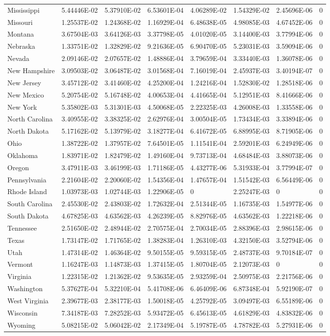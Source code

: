 \begin{longtable}[c]{p{0.75in}p{0.75in}p{0.75in}p{0.75in}p{0.75in}p{0.75in}p{0.75in}p{0.75in}}
Mississippi & 5.44446E-02 & 5.37910E-02 & 6.53601E-04 & 4.06289E-02 & 1.54329E-02 & 2.45696E-06 & 0 \tabularnewline
Missouri & 1.25537E-02 & 1.24368E-02 & 1.16929E-04 & 6.48638E-05 & 4.98085E-03 & 4.67452E-06 & 0 \tabularnewline
Montana & 3.67504E-03 & 3.64126E-03 & 3.37798E-05 & 4.01020E-05 & 3.14400E-03 & 3.77994E-06 & 0 \tabularnewline
Nebraska & 1.33751E-02 & 1.32829E-02 & 9.21636E-05 & 6.90470E-05 & 5.23031E-03 & 3.59094E-06 & 0 \tabularnewline
Nevada & 2.09146E-02 & 2.07657E-02 & 1.48886E-04 & 3.79659E-04 & 3.33440E-03 & 1.36078E-06 & 0 \tabularnewline
New Hampshire & 3.09503E-02 & 3.06487E-02 & 3.01568E-04 & 7.16019E-04 & 2.45937E-03 & 3.40194E-07 & 0 \tabularnewline
New Jersey & 3.45712E-02 & 3.41460E-02 & 4.25200E-04 & 1.24216E-04 & 1.52830E-02 & 1.28518E-06 & 0 \tabularnewline
New Mexico & 5.20754E-02 & 5.16748E-02 & 4.00653E-04 & 4.41665E-04 & 5.12951E-03 & 8.41666E-06 & 0 \tabularnewline
New York & 5.35802E-03 & 5.31301E-03 & 4.50068E-05 & 2.22325E-03 & 4.26008E-03 & 1.33558E-06 & 0 \tabularnewline
North Carolina & 3.40955E-02 & 3.38325E-02 & 2.62976E-04 & 3.00504E-05 & 1.73434E-03 & 3.33894E-06 & 0 \tabularnewline
North Dakota & 5.17162E-02 & 5.13979E-02 & 3.18277E-04 & 6.41672E-05 & 6.88995E-03 & 8.71905E-06 & 0 \tabularnewline
Ohio & 1.38722E-02 & 1.37957E-02 & 7.64501E-05 & 1.11541E-04 & 2.59201E-03 & 6.24949E-06 & 0 \tabularnewline
Oklahoma & 1.83971E-02 & 1.82479E-02 & 1.49160E-04 & 9.73713E-04 & 4.68484E-03 & 3.88073E-06 & 0 \tabularnewline
Oregon & 3.47911E-03 & 3.46199E-03 & 1.71186E-05 & 4.43277E-06 & 5.31933E-04 & 3.77994E-07 & 0 \tabularnewline
Pennsylvania & 2.21604E-02 & 2.20060E-02 & 1.54356E-04 & 1.47657E-04 & 1.51542E-03 & 6.56449E-06 & 0 \tabularnewline
Rhode Island & 1.03973E-03 & 1.02744E-03 & 1.22906E-05 & 0 & 2.25247E-03 & 0 & 0 \tabularnewline
South Carolina & 2.45530E-02 & 2.43803E-02 & 1.72632E-04 & 2.51344E-05 & 1.16735E-03 & 1.54977E-06 & 0 \tabularnewline
South Dakota & 4.67825E-03 & 4.63562E-03 & 4.26239E-05 & 8.82976E-05 & 4.63562E-03 & 1.22218E-06 & 0 \tabularnewline
Tennessee & 2.51650E-02 & 2.48944E-02 & 2.70575E-04 & 2.70034E-05 & 2.88396E-03 & 2.98615E-06 & 0 \tabularnewline
Texas & 1.73147E-02 & 1.71765E-02 & 1.38283E-04 & 1.26310E-03 & 4.32150E-03 & 3.52794E-06 & 0 \tabularnewline
Utah & 1.47314E-02 & 1.46364E-02 & 9.50155E-05 & 9.59315E-05 & 2.48737E-03 & 9.70184E-07 & 0 \tabularnewline
Vermont & 1.16247E-03 & 1.14873E-03 & 1.37415E-05 & 1.80704E-05 & 2.12073E-03 & 0 & 0 \tabularnewline
Virginia & 1.22315E-02 & 1.21362E-02 & 9.53635E-05 & 2.93259E-04 & 2.50975E-03 & 2.21756E-06 & 0 \tabularnewline
Washington & 5.37627E-04 & 5.32210E-04 & 5.41708E-06 & 6.46409E-06 & 6.87348E-04 & 5.92190E-07 & 0 \tabularnewline
West Virginia & 2.39677E-03 & 2.38177E-03 & 1.50018E-05 & 4.25792E-05 & 3.09497E-03 & 6.55189E-06 & 0 \tabularnewline
Wisconsin & 7.34187E-03 & 7.28252E-03 & 5.93472E-05 & 6.45613E-05 & 4.61829E-03 & 4.83832E-06 & 0 \tabularnewline
Wyoming & 5.08215E-02 & 5.06042E-02 & 2.17349E-04 & 5.19787E-05 & 4.78782E-03 & 5.27931E-06 & 0 \tabularnewline
\bottomrule
\end{longtable}

